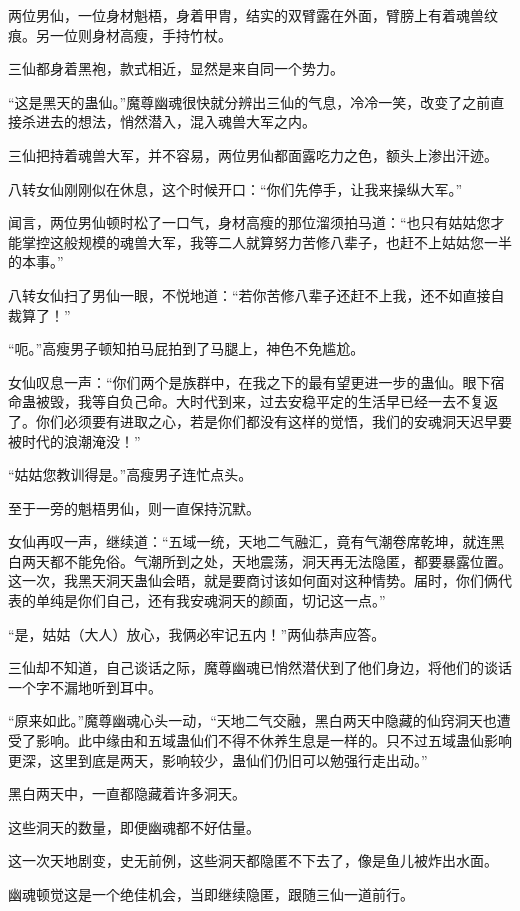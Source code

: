 \begin{this_body}
两位男仙，一位身材魁梧，身着甲胄，结实的双臂露在外面，臂膀上有着魂兽纹痕。另一位则身材高瘦，手持竹杖。

三仙都身着黑袍，款式相近，显然是来自同一个势力。

“这是黑天的蛊仙。”魔尊幽魂很快就分辨出三仙的气息，冷冷一笑，改变了之前直接杀进去的想法，悄然潜入，混入魂兽大军之内。

三仙把持着魂兽大军，并不容易，两位男仙都面露吃力之色，额头上渗出汗迹。

八转女仙刚刚似在休息，这个时候开口：“你们先停手，让我来操纵大军。”

闻言，两位男仙顿时松了一口气，身材高瘦的那位溜须拍马道：“也只有姑姑您才能掌控这般规模的魂兽大军，我等二人就算努力苦修八辈子，也赶不上姑姑您一半的本事。”

八转女仙扫了男仙一眼，不悦地道：“若你苦修八辈子还赶不上我，还不如直接自裁算了！”

“呃。”高瘦男子顿知拍马屁拍到了马腿上，神色不免尴尬。

女仙叹息一声：“你们两个是族群中，在我之下的最有望更进一步的蛊仙。眼下宿命蛊被毁，我等自负己命。大时代到来，过去安稳平定的生活早已经一去不复返了。你们必须要有进取之心，若是你们都没有这样的觉悟，我们的安魂洞天迟早要被时代的浪潮淹没！”

“姑姑您教训得是。”高瘦男子连忙点头。

至于一旁的魁梧男仙，则一直保持沉默。

女仙再叹一声，继续道：“五域一统，天地二气融汇，竟有气潮卷席乾坤，就连黑白两天都不能免俗。气潮所到之处，天地震荡，洞天再无法隐匿，都要暴露位置。这一次，我黑天洞天蛊仙会晤，就是要商讨该如何面对这种情势。届时，你们俩代表的单纯是你们自己，还有我安魂洞天的颜面，切记这一点。”

“是，姑姑（大人）放心，我俩必牢记五内！”两仙恭声应答。

三仙却不知道，自己谈话之际，魔尊幽魂已悄然潜伏到了他们身边，将他们的谈话一个字不漏地听到耳中。

“原来如此。”魔尊幽魂心头一动，“天地二气交融，黑白两天中隐藏的仙窍洞天也遭受了影响。此中缘由和五域蛊仙们不得不休养生息是一样的。只不过五域蛊仙影响更深，这里到底是两天，影响较少，蛊仙们仍旧可以勉强行走出动。”

黑白两天中，一直都隐藏着许多洞天。

这些洞天的数量，即便幽魂都不好估量。

这一次天地剧变，史无前例，这些洞天都隐匿不下去了，像是鱼儿被炸出水面。

幽魂顿觉这是一个绝佳机会，当即继续隐匿，跟随三仙一道前行。


\end{this_body}
